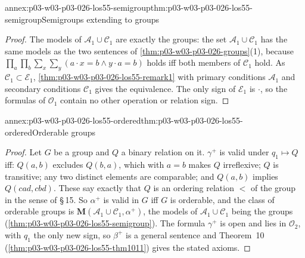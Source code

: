 \begin{annexitem}{annex:p03-w03-p03-026-los55-semigroup}{thm:p03-w03-p03-026-los55-semigroup}{Semigroups extending to groups}
\begin{proof}
The models of \(\mathcal A_1\cup\mathcal C_1\) are exactly the groups: the
set \(\mathcal A_1\cup\mathcal C_1\) has the same models as the two sentences of
\cref{thm:p03-w03-p03-026-groups}(1), because
\(\prod_{a}\prod_{b}\sum_{x}\sum_{y}(a\cdot x=b\land y\cdot a=b)\) holds iff
both members of \(\mathcal C_1\) hold.  As \(\mathcal C_1\subset\mathcal E_1\),
\cref{thm:p03-w03-p03-026-los55-remark1} with primary conditions
\(\mathcal A_1\) and secondary conditions \(\mathcal C_1\) gives the
equivalence.  The only sign of \(\mathcal E_1\) is \(\cdot\), so the formulas
of \(\mathcal O_1\) contain no other operation or relation sign.
\end{proof}
\end{annexitem}

\begin{annexitem}{annex:p03-w03-p03-026-los55-ordered}{thm:p03-w03-p03-026-los55-ordered}{Orderable groups}
\begin{proof}
Let \(G\) be a group and \(Q\) a binary relation on it.  \(\gamma^+\) is
valid under \(q_1\mapsto Q\) iff: \(Q(a,b)\) excludes \(Q(b,a)\), which with
\(a=b\) makes \(Q\) irreflexive; \(Q\) is transitive; any two distinct
elements are comparable; and \(Q(a,b)\) implies \(Q(cad,cbd)\).  These say
exactly that \(Q\) is an ordering relation \(<\) of the group in the sense
of \S\,15.  So \(\alpha^+\) is valid in \(G\) iff \(G\) is orderable, and the
class of orderable groups is \(\mathbf M(\mathcal A_1\cup\mathcal C_1,\alpha^+)\),
the models of \(\mathcal A_1\cup\mathcal C_1\) being the groups
(\cref{thm:p03-w03-p03-026-los55-semigroup}).  The formula \(\gamma^+\) is
open and lies in \(\mathcal O_2\), with \(q_1\) the only new sign, so
\(\beta^+\) is a general sentence and Theorem~10
(\cref{thm:p03-w03-p03-026-los55-thm1011}) gives the stated axioms.
\end{proof}
\end{annexitem}

